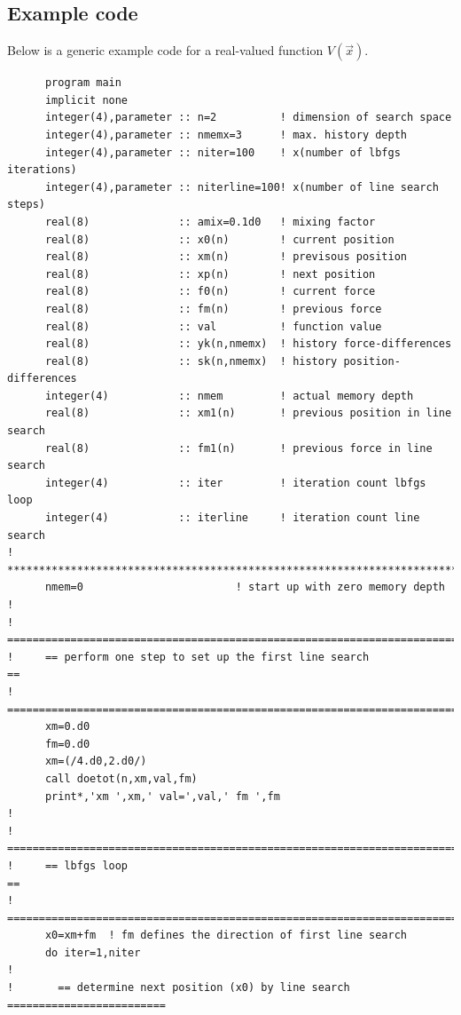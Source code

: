 \documentclass[11pt,a4paper]{report}
\begin{document}
\subsection{Example code}
Below is a generic example code for a real-valued function $V(\vec{x})$.
{\tiny
\begin{verbatim}
      program main
      implicit none
      integer(4),parameter :: n=2          ! dimension of search space
      integer(4),parameter :: nmemx=3      ! max. history depth
      integer(4),parameter :: niter=100    ! x(number of lbfgs iterations)
      integer(4),parameter :: niterline=100! x(number of line search steps)
      real(8)              :: amix=0.1d0   ! mixing factor
      real(8)              :: x0(n)        ! current position
      real(8)              :: xm(n)        ! previsous position
      real(8)              :: xp(n)        ! next position
      real(8)              :: f0(n)        ! current force
      real(8)              :: fm(n)        ! previous force
      real(8)              :: val          ! function value
      real(8)              :: yk(n,nmemx)  ! history force-differences
      real(8)              :: sk(n,nmemx)  ! history position-differences
      integer(4)           :: nmem         ! actual memory depth
      real(8)              :: xm1(n)       ! previous position in line search
      real(8)              :: fm1(n)       ! previous force in line search
      integer(4)           :: iter         ! iteration count lbfgs loop
      integer(4)           :: iterline     ! iteration count line search
!     **************************************************************************
      nmem=0                        ! start up with zero memory depth
!
!     ==========================================================================
!     == perform one step to set up the first line search                     ==
!     ==========================================================================
      xm=0.d0
      fm=0.d0
      xm=(/4.d0,2.d0/)
      call doetot(n,xm,val,fm)
      print*,'xm ',xm,' val=',val,' fm ',fm
!
!     ==========================================================================
!     == lbfgs loop                                                           ==
!     ==========================================================================
      x0=xm+fm  ! fm defines the direction of first line search
      do iter=1,niter
!
!       == determine next position (x0) by line search =========================

\end{verbatim}}
\end{document}
